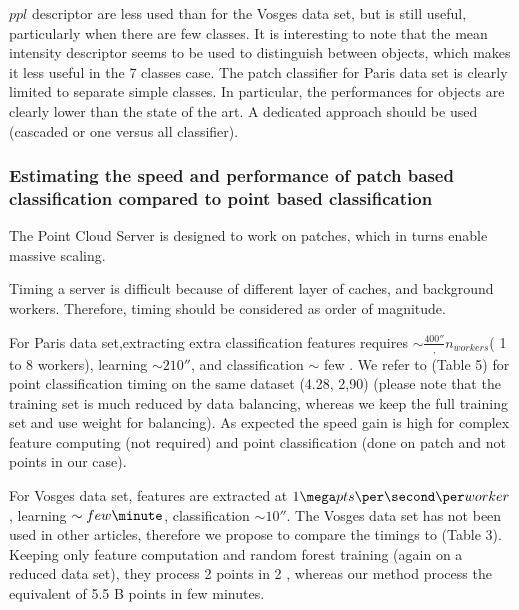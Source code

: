 		  $ppl$ descriptor are less used than for the Vosges data set, but is still useful, particularly when there are few classes.
		  It is interesting to note that the mean intensity descriptor seems to be used to distinguish between objects, which makes it less useful in the 7 classes case.
		  The patch classifier for Paris data set is clearly limited to separate simple classes. In particular, the performances for objects are clearly lower than the state of the art. A dedicated approach should be used (cascaded or one versus all classifier). 
	  
	  
	  \subsubsection{Estimating the speed and performance of patch based classification compared to point based classification}
		  The Point Cloud Server is designed to work on patches, which in turns enable massive scaling.
		  
		  Timing a server is difficult because of different layer of caches, and background workers. Therefore, timing should be considered as order of magnitude.
		  
		  For Paris data set,extracting extra classification features requires $\sim \frac{400 \second},{n_{workers}}$( 1 to 8 workers), learning $\sim 210 \second$,
		  and classification $\sim$ few \second.
		  We refer to \cite{Weinmann2015}(Table 5) for point classification timing on the same dataset (4.28\hour, 2\second,90\second ) (please note that the training set is much reduced by data balancing, whereas we keep the full training set and use weight for balancing).
		  As expected the speed gain is high for complex feature computing (not required) and point classification (done on patch and not points in our case).
		  
		  For Vosges data set, features are extracted at $1 \mega pts \per \second \per worker$, learning $\sim few \minute$, classification $\sim 10 \second$.
		  The Vosges data set has not been used in other articles, therefore we propose to compare the timings to \cite{shapovalov2010} (Table 3). Keeping only feature computation and random forest training (again on a reduced data set), they process 2 \mega points in 2 \minute, whereas our method process the equivalent of 5.5 B points in few minutes.
		  
